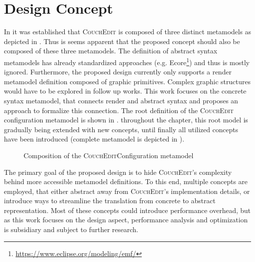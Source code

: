 \chapter{Design Concept}
\label{ch:design}
In  it was established that \textsc{CouchEdit} is composed of three distinct metamodels as depicted in . Thus is seems apparent that the proposed concept should also be composed of these three metamodels. The definition of abstract syntax metamodels has already standardized approaches (e.g. Ecore\footnote{\url{https://www.eclipse.org/modeling/emf/}}) and thus is mostly ignored. Furthermore, the proposed design currently only supports a render metamodel definition composed of graphic primitives. Complex graphic structures would have to be explored in follow up works. This work focuses on the concrete syntax metamodel, that connects render and abstract syntax and proposes an approach to formalize this connection. The root definition of the \textsc{CouchEdit} configuration metamodel is shown in . throughout the chapter, this root model is gradually being extended with new concepts, until finally all utilized concepts have been introduced (complete metamodel is depicted in ).

\begin{figure}
  \centering
  
  \caption{Composition of the \textsc{CouchEdit}Configuration metamodel}
  \label{fig:metamodel-base}
\end{figure}

The primary goal of the proposed design is to hide \textsc{CouchEdit}'s complexity behind more accessible metamodel definitions. To this end, multiple concepts are employed, that either abstract away from \textsc{CouchEdit}'s implementation details, or introduce ways to streamline the translation from concrete to abstract representation. Most of these concepts could introduce performance overhead, but as this work focuses on the design aspect, performance analysis and optimization is subsidiary and subject to further research.

